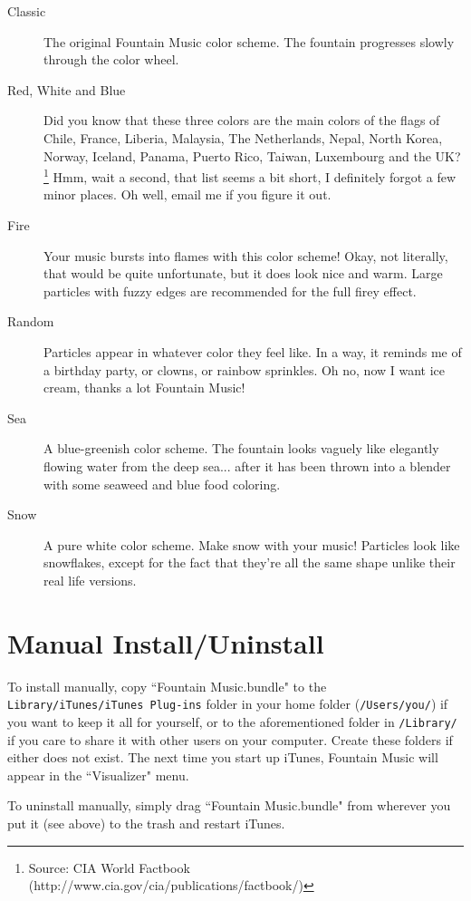 \documentclass[11pt]{article}
\begin{document}
\begin{description}
\item[Classic]
The original Fountain Music color scheme.  The fountain progresses slowly through the color wheel.
\item[Red, White and Blue]
Did you know that these three colors are the main colors of the flags of Chile, France, Liberia, Malaysia, The Netherlands, Nepal, North Korea, Norway, Iceland, Panama, Puerto Rico, Taiwan, Luxembourg and the UK?\footnote{Source: CIA World Factbook (http://www.cia.gov/cia/publications/factbook/)}  Hmm, wait a second, that list seems a bit short, I definitely forgot a few minor places.  Oh well, email me if you figure it out.
\item[Fire] 
Your music bursts into flames with this color scheme!  Okay, not literally, that would be quite unfortunate, but it does look nice and warm.  Large particles with fuzzy edges are recommended for the full firey effect.
\item[Random]
Particles appear in whatever color they feel like.  In a way, it reminds me of a birthday party, or clowns, or rainbow sprinkles.  Oh no, now I want ice cream, thanks a lot Fountain Music!
\item[Sea]
A blue-greenish color scheme.  The fountain looks vaguely like elegantly flowing water from the deep sea... after it has been thrown into a blender with some seaweed and blue food coloring.
\item[Snow]
A pure white color scheme. Make snow with your music!  Particles look like snowflakes, except for the fact that they're all the same shape unlike their real life versions.
\end{description}

\section*{Manual Install/Uninstall}
To install manually, copy ``Fountain Music.bundle" to the \verb|Library/iTunes/iTunes Plug-ins| folder in your home folder (\verb|/Users/you/|) if you want to keep it all for yourself, or to the aforementioned folder in \verb|/Library/| if you care to share it with other users on your computer.  Create these folders if either does not exist. The next time you start up iTunes, Fountain Music will appear in the ``Visualizer" menu.

To uninstall manually, simply drag ``Fountain Music.bundle" from wherever you put it (see above) to the trash and restart iTunes.
\end{document}
